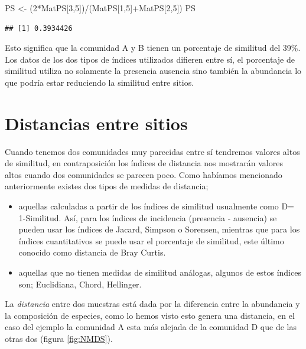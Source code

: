 \documentclass[]{book}
\newenvironment{Shaded}{\begin{snugshade}}{\end{snugshade}}
\newcommand{\DecValTok}[1]{\textcolor[rgb]{0.00,0.00,0.81}{{#1}}}
\newcommand{\StringTok}[1]{\textcolor[rgb]{0.31,0.60,0.02}{{#1}}}
\newcommand{\NormalTok}[1]{{#1}}
\begin{document}
\begin{Shaded}
\begin{Highlighting}[]
\NormalTok{PS <-}\StringTok{ }\NormalTok{(}\DecValTok{2}\NormalTok{*MatPS[}\DecValTok{3}\NormalTok{,}\DecValTok{5}\NormalTok{])/(MatPS[}\DecValTok{1}\NormalTok{,}\DecValTok{5}\NormalTok{]+MatPS[}\DecValTok{2}\NormalTok{,}\DecValTok{5}\NormalTok{])}
\NormalTok{PS}
\end{Highlighting}
\end{Shaded}

\begin{verbatim}
## [1] 0.3934426
\end{verbatim}

Esto significa que la comunidad A y B tienen un porcentaje de similitud
del 39\%. Los datos de los dos tipos de índices utilizados difieren
entre sí, el porcentaje de similitud utiliza no solamente la presencia
ausencia sino también la abundancia lo que podría estar reduciendo la
similitud entre sitios.

\chapter{Distancias entre sitios}\label{distancias-entre-sitios}

Cuando tenemos dos comunidades muy parecidas entre sí tendremos valores
altos de similitud, en contraposición los índices de distancia nos
mostrarán valores altos cuando dos comunidades se parecen poco. Como
habíamos mencionado anteriormente existes dos tipos de medidas de
distancia;

\begin{itemize}
\item
  aquellas calculadas a partir de los índices de similitud usualmente
  como D= 1-Similitud. Así, para los índices de incidencia (presencia -
  ausencia) se pueden usar los índices de Jacard, Simpson o Sorensen,
  mientras que para los índices cuantitativos se puede usar el
  porcentaje de similitud, este último conocido como distancia de Bray
  Curtis.
\item
  aquellas que no tienen medidas de similitud análogas, algunos de estos
  índices son; Euclidiana, Chord, Hellinger.
\end{itemize}

La \emph{distancia} entre dos muestras está dada por la diferencia entre
la abundancia y la composición de especies, como lo hemos visto esto
genera una distancia, en el caso del ejemplo la comunidad A esta más
alejada de la comunidad D que de las otras dos (figura \ref{fig:NMDS}).
\end{document}
